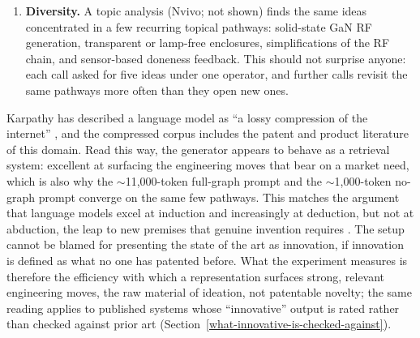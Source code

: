 \begin{enumerate}
    \begin{quote}

  \emph{Ghost Lamp Vision: Replace the Interior Lamp With Microwave-Transparent Walls}; 

  \emph{GaN Universal-Mains Power Stage Replaces HV Transformer Stack}; 
  
  \emph{Capacitor-Free 48 V Bus Power Stage}; 
  
  \emph{Direct-Coupled Magnetron Pod (No Waveguide Duct)}. 
  
  \end{quote}
  
  The GaN power stage here is not materially different from the GaN ideas at the top of the ranking. Part of the gap is defensible, since the judge marks a power-supply substitution down on relevance when it is aimed at a market need it cannot serve; but the same technical move appearing at both ends of the ranking shows that an AI ranker is not entirely consistent, and that its scores reflect the fit between a move and the target market need as much as the move itself.
\item
  \textbf{Diversity.} A topic analysis (Nvivo; not shown) finds the same ideas concentrated in a few recurring topical pathways: solid-state GaN RF generation, transparent or lamp-free enclosures, simplifications of the RF chain, and sensor-based doneness feedback. This should not surprise anyone: each call asked for five ideas under one operator, and further calls revisit the same pathways more often than they open new ones.
\end{enumerate}

Karpathy has described a language model as ``a lossy compression of the internet'' \citep{Karpathy2023}, and the compressed corpus includes the patent and product literature of this domain. Read this way, the generator appears to behave as a retrieval system: excellent at surfacing the engineering moves that bear on a market need, which is also why the \ensuremath{\sim}11,000-token full-graph prompt and the \ensuremath{\sim}1,000-token no-graph prompt converge on the same few pathways. This matches the argument that language models excel at induction and increasingly at deduction, but not at abduction, the leap to new premises that genuine invention requires \citep{Zahavy2026}. The setup cannot be blamed for presenting the state of the art as innovation, if innovation is defined as what no one has patented before. What the experiment measures is therefore the efficiency with which a representation surfaces strong, relevant engineering moves, the raw material of ideation, not patentable novelty; the same reading applies to published systems whose ``innovative'' output is rated rather than checked against prior art (Section~\ref{what-innovative-is-checked-against}).

